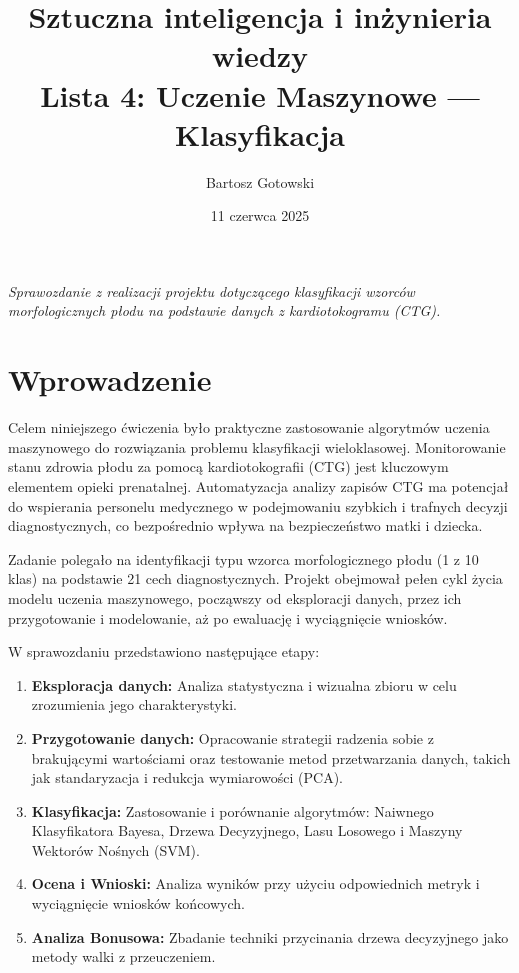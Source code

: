 \documentclass[12pt,a4paper]{article}
\title{\LARGE \textbf{Sztuczna inteligencja i inżynieria wiedzy}\\[0.5em]
\large Lista 4: Uczenie Maszynowe — Klasyfikacja}
\author{Bartosz Gotowski}
\date{11 czerwca 2025}
\begin{document}
\maketitle
\begin{center}
    \textit{Sprawozdanie z realizacji projektu dotyczącego klasyfikacji wzorców morfologicznych płodu na podstawie danych z kardiotokogramu (CTG).}
\end{center}
\vspace{1cm}

\tableofcontents
\clearpage

\section{Wprowadzenie}
Celem niniejszego ćwiczenia było praktyczne zastosowanie algorytmów uczenia maszynowego do rozwiązania problemu klasyfikacji wieloklasowej. Monitorowanie stanu zdrowia płodu za pomocą kardiotokografii (CTG) jest kluczowym elementem opieki prenatalnej. Automatyzacja analizy zapisów CTG ma potencjał do wspierania personelu medycznego w podejmowaniu szybkich i trafnych decyzji diagnostycznych, co bezpośrednio wpływa na bezpieczeństwo matki i dziecka.

Zadanie polegało na identyfikacji typu wzorca morfologicznego płodu (1 z 10 klas) na podstawie 21 cech diagnostycznych. Projekt obejmował pełen cykl życia modelu uczenia maszynowego, począwszy od eksploracji danych, przez ich przygotowanie i modelowanie, aż po ewaluację i wyciągnięcie wniosków.

W sprawozdaniu przedstawiono następujące etapy:
\begin{enumerate}
    \item \textbf{Eksploracja danych:} Analiza statystyczna i wizualna zbioru w celu zrozumienia jego charakterystyki.
    \item \textbf{Przygotowanie danych:} Opracowanie strategii radzenia sobie z brakującymi wartościami oraz testowanie metod przetwarzania danych, takich jak standaryzacja i redukcja wymiarowości (PCA).
    \item \textbf{Klasyfikacja:} Zastosowanie i porównanie algorytmów: Naiwnego Klasyfikatora Bayesa, Drzewa Decyzyjnego, Lasu Losowego i Maszyny Wektorów Nośnych (SVM).
    \item \textbf{Ocena i Wnioski:} Analiza wyników przy użyciu odpowiednich metryk i wyciągnięcie wniosków końcowych.
    \item \textbf{Analiza Bonusowa:} Zbadanie techniki przycinania drzewa decyzyjnego jako metody walki z przeuczeniem.
\end{enumerate}
\end{document}
